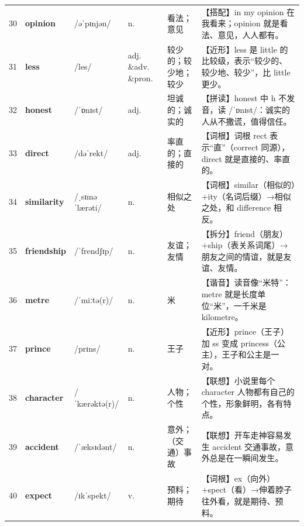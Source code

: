 \documentclass[UTF8,a4paper,11pt,oneside]{ctexbook}
\newcommand{\cellword}[1]{{\bfseries\textcolor{wordcol}{#1}}}
\newcommand{\cellipa}[1]{{\footnotesize\textcolor{ipacol}{#1}}}
\newcommand{\cellpos}[1]{\textcolor{poscol}{#1}}
\newcommand{\cellno}[1]{\textcolor{volcolor!75!black}{#1}}
\begin{document}
{\begin{longtable}{@{}C{0.045\textwidth}L{0.155\textwidth}L{0.175\textwidth}C{0.070\textwidth}L{0.180\textwidth}L{0.282\textwidth}@{}}
\cellno{30} & \cellword{opinion} & \cellipa{/əˈpɪnjən/} & \cellpos{n.} & 看法；意见 & \textcolor{tagColloc}{【搭配】}in my opinion 在我看来；opinion 就是看法、意见，人人都有。 \\
 \cellno{31} & \cellword{less} & \cellipa{/les/} & \cellpos{adj. \&adv. \&pron.} & 较少的；较少地；较少 & \textcolor{tagNear}{【近形】}less 是 little 的比较级，表示“较少的、较少地、较少”，比 little 更少。 \\
\cellno{32} & \cellword{honest} & \cellipa{/ˈɒnɪst/} & \cellpos{adj.} & 坦诚的；诚实的 & \textcolor{tagSpell}{【拼读】}honest 中 h 不发音，读 /ˈɒnɪst/：诚实的人从不撒谎，值得信任。 \\
 \cellno{33} & \cellword{direct} & \cellipa{/dəˈrekt/} & \cellpos{adj.} & 率直的；直接的 & \textcolor{tagRoot}{【词根】}词根 rect 表示“直”（correct 同源），direct 就是直接的、率直的。 \\
\cellno{34} & \cellword{similarity} & \cellipa{/ˌsɪməˈlærəti/} & \cellpos{n.} & 相似之处 & \textcolor{tagRoot}{【词根】}similar（相似的）+ity（名词后缀）→\allowbreak{}相似之处，和 difference 相反。 \\
 \cellno{35} & \cellword{friendship} & \cellipa{/ˈfrendʃɪp/} & \cellpos{n.} & 友谊；友情 & \textcolor{tagSplit}{【拆分】}friend（朋友）+ship（表关系词尾）→\allowbreak{}朋友之间的情谊，就是友谊、友情。 \\
\cellno{36} & \cellword{metre} & \cellipa{/ˈmiːtə(r)/} & \cellpos{n.} & 米 & \textcolor{tagSound}{【谐音】}读音像“米特”：metre 就是长度单位“米”，一千米是 kilometre。 \\
 \cellno{37} & \cellword{prince} & \cellipa{/prɪns/} & \cellpos{n.} & 王子 & \textcolor{tagNear}{【近形】}prince（王子）加 ss 变成 princess（公主），王子和公主是一对。 \\
\cellno{38} & \cellword{character} & \cellipa{/ˈkærəktə(r)/} & \cellpos{n.} & 人物；个性 & \textcolor{tagAssoc}{【联想】}小说里每个 character 人物都有自己的个性，形象鲜明，各有特点。 \\
 \cellno{39} & \cellword{accident} & \cellipa{/ˈæksɪdənt/} & \cellpos{n.} & 意外；（交通）事故 & \textcolor{tagAssoc}{【联想】}开车走神容易发生 accident 交通事故，意外总是在一瞬间发生。 \\
\cellno{40} & \cellword{expect} & \cellipa{/ɪkˈspekt/} & \cellpos{v.} & 预料；期待 & \textcolor{tagRoot}{【词根】}ex（向外）+spect（看）→\allowbreak{}伸着脖子往外看，就是期待、预料。 \\

\end{longtable}}
\end{document}

